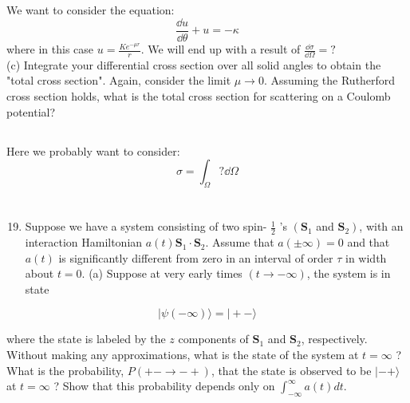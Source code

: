 \documentclass[12pt]{article}
\begin{document}
\subsection{}
We want to consider the equation:
\begin{equation}
  \frac{\dd{ u}}{\dd{\theta }} +u = - \kappa 
\end{equation}
where in this case $u= \frac{Ke^{-\mu r }}{r}$. We will end up with a result of $\frac{\dd{\sigma }}{\dd{\Omega }}=?$\\
(c) Integrate your differential cross section over all solid angles to obtain the "total cross section". Again, consider the limit $\mu \rightarrow 0$. Assuming the Rutherford cross section holds, what is the total cross section for scattering on a Coulomb potential?
\subsection{}
Here we probably want to consider:
\begin{equation}
  \sigma = \int_{\Omega }? \dd{\Omega } 
\end{equation}
\section{}
\begin{enumerate}
  \setcounter{enumi}{18}
  \item Suppose we have a system consisting of two spin- $\frac{1}{2}$ 's $\left(\mathbf{S}_{1}\right.$ and $\left.\mathbf{S}_{2}\right)$, with an interaction Hamiltonian $a(t) \mathbf{S}_{1} \cdot \mathbf{S}_{2}$. Assume that $a( \pm \infty)=0$ and that $a(t)$ is significantly different from zero in an interval of order $\tau$ in width about $t=0$.
(a) Suppose at very early times $(t \rightarrow-\infty)$, the system is in state
\end{enumerate}

$$
|\psi(-\infty)\rangle=|+-\rangle
$$

where the state is labeled by the $z$ components of $\mathbf{S}_{1}$ and $\mathbf{S}_{2}$, respectively. Without making any approximations, what is the state of the system at $t=\infty$ ? What is the probability, $P(+-\rightarrow-+)$, that the state is observed to be $|-+\rangle$ at $t=\infty$ ? Show that this probability depends only on $\int_{-\infty}^{\infty} a(t) d t$.
\end{document}
